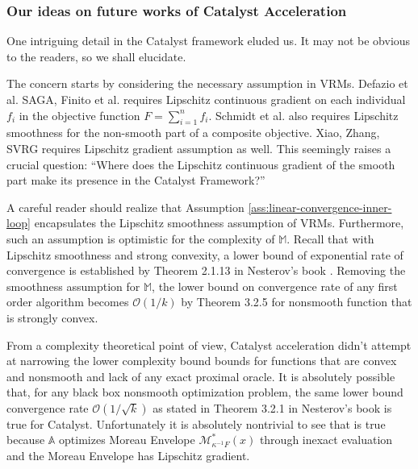 \documentclass[12pt]{article}
\begin{document}
        \subsubsection{Our ideas on future works of Catalyst Acceleration}
            One intriguing detail in the Catalyst framework eluded us. 
            It may not be obvious to the readers, so we shall elucidate. 
            \par
            The concern starts by considering the necessary assumption in VRMs. 
            Defazio et al.\cite{defazio_saga_2014} SAGA, Finito et al. \cite{defazio_finito_2014} requires Lipschitz continuous gradient on each individual $f_i$ in the objective function $F = \sum_{i = 1}^n f_i$. 
            Schmidt et al. \cite{schmidt_minimizing_2017} also requires Lipschitz smoothness for the non-smooth part of a composite objective. 
            Xiao, Zhang, SVRG \cite{xiao_proximal_2014} requires Lipschitz gradient assumption as well. 
            This seemingly raises a crucial question: ``Where does the Lipschitz continuous gradient of the smooth part make its presence in the Catalyst Framework?''
            \par
            A careful reader should realize that Assumption \ref{ass:linear-convergence-inner-loop} encapsulates the Lipschitz smoothness assumption of VRMs. 
            Furthermore, such an assumption is optimistic for the complexity of $\mathbb M$. 
            Recall that with Lipschitz smoothness and strong convexity, a lower bound of exponential rate of convergence is established by Theorem 2.1.13 in Nesterov's book \cite{nesterov_lectures_2018}. 
            Removing the smoothness assumption for $\mathbb M$, the lower bound on convergence rate of any first order algorithm becomes $\mathcal O(1/k)$ by Theorem 3.2.5 for nonsmooth function that is strongly convex. 
            \par
            From a complexity theoretical point of view, Catalyst acceleration didn't attempt at narrowing the lower complexity bound bounds for functions that are convex and nonsmooth and lack of any exact proximal oracle. 
            It is absolutely possible that, for any black box nonsmooth optimization problem, the same lower bound convergence rate $\mathcal O\left(1/\sqrt{k}\right)$ as stated in Theorem 3.2.1 in Nesterov's book \cite{nesterov_lectures_2018} is true for Catalyst. 
            Unfortunately it is absolutely nontrivial to see that is true because $\mathbb A$ optimizes Moreau Envelope $\mathcal M^*_{\kappa^{-1}F}(x)$ through inexact evaluation and the Moreau Envelope has Lipschitz gradient. 
\end{document}
